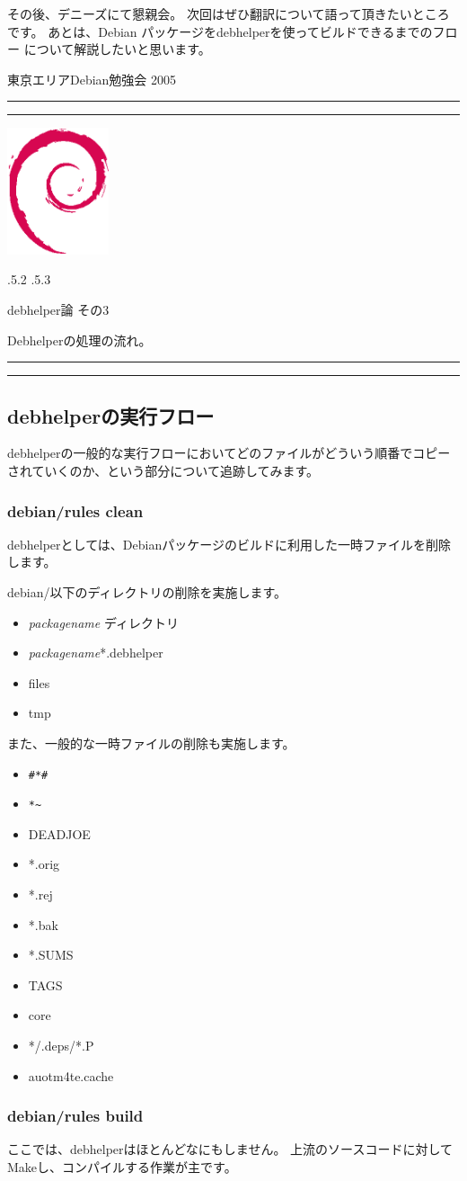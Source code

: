 \documentclass[mingoth]{jsarticle}
\makeatletter
\renewcommand{\section}{\@startsection{section}{1}{\z@}%
    {\Cvs \@plus.5\Cdp \@minus.2\Cdp}%
    {.5\Cvs \@plus.3\Cdp}%
    {\normalfont\Large\headfont\raggedright\centering}} %
\newcommand{\dancersection}[2]{%
\newpage
東京エリアDebian勉強会 2005
\hrule
\vspace{0.5mm}
\hrule
\hfill{}\includegraphics[width=3cm]{image200502/openlogo-nd.eps}\\
\vspace{-4cm}
\begin{center}
  \section{#1}
\end{center}
\hfill{}#2\hspace{3cm}\space\\
\hrule
\hrule
\vspace{1cm}
}
\makeatother
\begin{document}
	  その後、デニーズにて懇親会。
	    次回はぜひ翻訳について語って頂きたいところです。
	    あとは、Debian パッケージをdebhelperを使ってビルドできるまでのフロー
	    について解説したいと思います。


\dancersection{debhelper論 その3}{Debhelperの処理の流れ。}

\subsection{debhelperの実行フロー}

debhelperの一般的な実行フローにおいてどのファイルがどういう順番でコピー
されていくのか、という部分について追跡してみます。

\subsubsection{debian/rules clean}

debhelperとしては、Debianパッケージのビルドに利用した一時ファイルを削除
します。

debian/以下のディレクトリの削除を実施します。
\begin{itemize}
 \item {\it packagename} ディレクトリ
 \item  {\it packagename}*.debhelper
 \item files
 \item tmp
\end{itemize}

また、一般的な一時ファイルの削除も実施します。
\begin{itemize}
 \item \verb!#*#!
 \item \verb!*~!
 \item DEADJOE
 \item *.orig
 \item *.rej
 \item *.bak
 \item *.SUMS
 \item TAGS
 \item core
 \item */.deps/*.P
 \item auotm4te.cache
\end{itemize}


\subsubsection{debian/rules build}

ここでは、debhelperはほとんどなにもしません。
上流のソースコードに対してMakeし、コンパイルする作業が主です。
\end{document}
